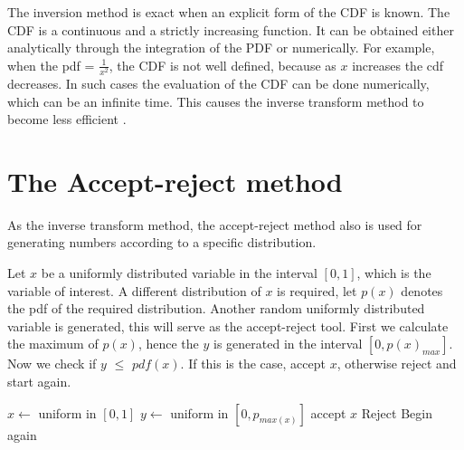 The inversion method is exact when an explicit form of the CDF is known. The CDF is a continuous and a strictly increasing function. It can be obtained either analytically through the integration of the PDF or numerically. For example, when the pdf = $\frac{1}{x^2}$, the CDF is not well defined, because as $x$ increases the cdf decreases. In such cases the evaluation of the CDF can be done numerically, which can be an infinite time. This causes the inverse transform method to become less efficient \citep{Devroye:1986:SNR:318242.318443}.

\section{The Accept-reject method}
As the inverse transform method, the accept-reject method also is used for generating numbers according to a specific distribution.

Let $x$ be a uniformly distributed variable in the interval $[0,1]$, which is the variable of interest. A different distribution of $x$ is required, let $p(x)$ denotes the pdf of the required distribution. Another  random uniformly distributed variable is generated, this will serve as the accept-reject tool. First we calculate the maximum of $p(x)$, hence the $y$ is generated in the interval $[0,p(x)_{max}]$. Now we check if $y$ $\leq$ $pdf(x)$. If this is the case, accept $x$, otherwise reject and start again. 
\begin{algorithmic} 
\State $x \gets$ uniform in $[0, 1]$
\State $y \gets$ uniform in $[0, p_{max(x)}]$
    \State accept $x$
\Else 
	\State Reject 
\EndIf
\State Begin again
\end{algorithmic}
% 

 
